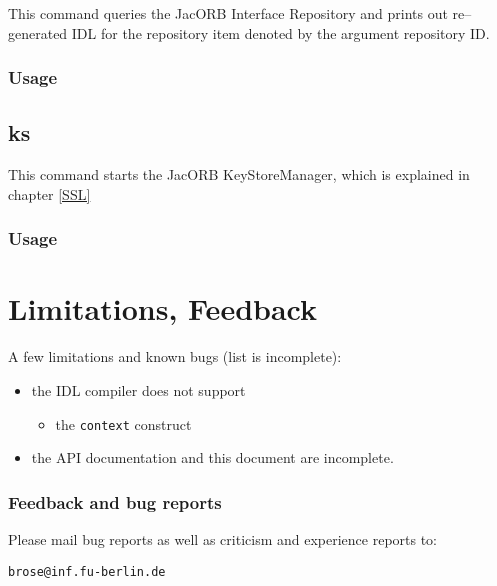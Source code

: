 \documentclass[12pt]{scrbook}
\begin{document}
This command queries the JacORB Interface Repository and prints out
re--generated IDL for the repository item denoted by the argument
repository ID.

\subsection*{Usage}


\section{ks}

This command starts the JacORB KeyStoreManager, which is explained in
chapter \ref{SSL}

\subsection*{Usage}



\chapter{Limitations, Feedback}

A few limitations and known bugs (list is incomplete):

\begin{itemize}
    \item the IDL compiler does not support 
    \begin{itemize}
        \item the {\tt context} construct
    \end{itemize}
    \item the API documentation and this document are incomplete.
\end{itemize}

\subsection*{Feedback and bug reports}

Please mail bug reports as well as criticism and experience reports to:

\verb+brose@inf.fu-berlin.de+

{


}
\end{document}
